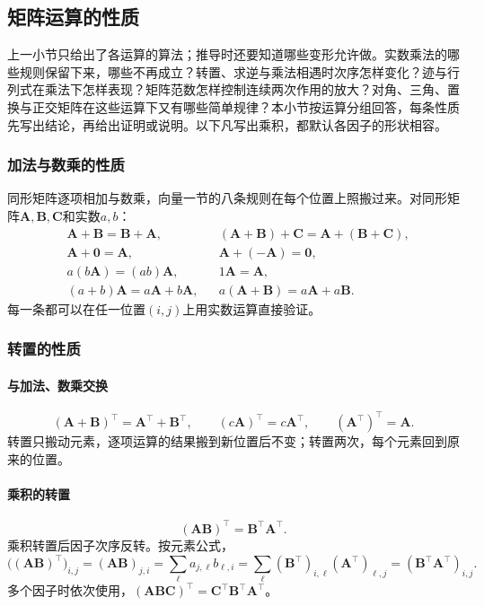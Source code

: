 
\subsection{矩阵运算的性质}
\label{sec:ls-matrix-operation-properties}
\label{sec:prelim-matrix-operation-rules}
\label{sec:linear-algebra-map-composition}

上一小节只给出了各运算的算法；推导时还要知道哪些变形允许做。实数乘法的哪些规则保留下来，哪些不再成立？转置、求逆与乘法相遇时次序怎样变化？迹与行列式在乘法下怎样表现？矩阵范数怎样控制连续两次作用的放大？对角、三角、置换与正交矩阵在这些运算下又有哪些简单规律？本小节按运算分组回答，每条性质先写出结论，再给出证明或说明。以下凡写出乘积，都默认各因子的形状相容。

\subsubsection{加法与数乘的性质}

同形矩阵逐项相加与数乘，向量一节的八条规则在每个位置上照搬过来。对同形矩阵$\bm A,\bm B,\bm C$和实数$a,b$：
\[
\begin{aligned}
 &\bm A+\bm B=\bm B+\bm A, && (\bm A+\bm B)+\bm C=\bm A+(\bm B+\bm C),\\
 &\bm A+\bm0=\bm A, && \bm A+(-\bm A)=\bm0,\\
 &a(b\bm A)=(ab)\bm A, && 1\bm A=\bm A,\\
 &(a+b)\bm A=a\bm A+b\bm A, && a(\bm A+\bm B)=a\bm A+a\bm B.
\end{aligned}
\]
每一条都可以在任一位置$(i,j)$上用实数运算直接验证。

\subsubsection{转置的性质}
\label{sec:ls-reshaping}

\paragraph{与加法、数乘交换}
\[
 (\bm A+\bm B)^\top=\bm A^\top+\bm B^\top,\qquad
 (c\bm A)^\top=c\bm A^\top,\qquad
 (\bm A^\top)^\top=\bm A.
\]
转置只搬动元素，逐项运算的结果搬到新位置后不变；转置两次，每个元素回到原来的位置。

\paragraph{乘积的转置}
\[
 (\bm A\bm B)^\top=\bm B^\top\bm A^\top.
\]
乘积转置后因子次序反转。按元素公式，
\[
 \bigl((\bm A\bm B)^\top\bigr)_{i,j}=(\bm A\bm B)_{j,i}=\sum_\ell a_{j,\ell}b_{\ell,i}
 =\sum_\ell(\bm B^\top)_{i,\ell}(\bm A^\top)_{\ell,j}=(\bm B^\top\bm A^\top)_{i,j}.
\]
多个因子时依次使用，$(\bm A\bm B\bm C)^\top=\bm C^\top\bm B^\top\bm A^\top$。

